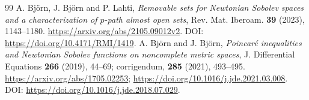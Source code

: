 \documentclass[11pt,a4paper]{article}
\theoremstyle{remark}
\begin{document}
\begingroup\small
\begin{thebibliography}{99}
 A. Bj\"orn, J. Bj\"orn and P. Lahti, \emph{Removable sets for Newtonian Sobolev spaces and a characterization of $p$-path almost open sets}, Rev. Mat. Iberoam. \textbf{39} (2023), 1143--1180. \url{https://arxiv.org/abs/2105.09012v2}. DOI: \url{https://doi.org/10.4171/RMI/1419}.
 A. Bj\"orn and J. Bj\"orn, \emph{Poincar\'e inequalities and Newtonian Sobolev functions on noncomplete metric spaces}, J. Differential Equations \textbf{266} (2019), 44--69; corrigendum, \textbf{285} (2021), 493--495. \url{https://arxiv.org/abs/1705.02253}; \url{https://doi.org/10.1016/j.jde.2021.03.008}. DOI: \url{https://doi.org/10.1016/j.jde.2018.07.029}.
\end{thebibliography}
\endgroup
\end{document}
